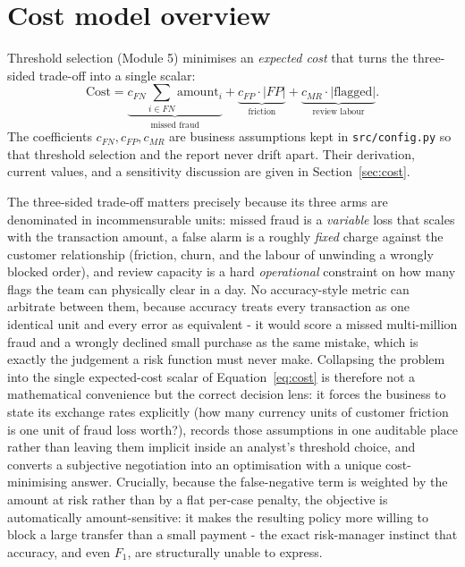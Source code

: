\documentclass[11pt,a4paper]{report}
\newcommand{\code}[1]{\texttt{\small #1}}
\begin{document}
\section{Cost model overview}
\label{sec:costoverview}

Threshold selection (Module 5) minimises an \emph{expected cost} that turns the three-sided
trade-off into a single scalar:
\begin{equation}
\label{eq:cost}
\text{Cost} =
\underbrace{c_{FN}\!\!\sum_{i\in FN}\!\text{amount}_i}_{\text{missed fraud}}
+\underbrace{c_{FP}\cdot|FP|}_{\text{friction}}
+\underbrace{c_{MR}\cdot|\text{flagged}|}_{\text{review labour}} .
\end{equation}
The coefficients $c_{FN}, c_{FP}, c_{MR}$ are business assumptions kept in
\code{src/config.py} so that threshold selection and the report never drift apart. Their
derivation, current values, and a sensitivity discussion are given in
Section~\ref{sec:cost}.

The three-sided trade-off matters precisely because its three arms are denominated in incommensurable units: missed fraud is a \emph{variable} loss that scales with the transaction amount, a false alarm is a roughly \emph{fixed} charge against the customer relationship (friction, churn, and the labour of unwinding a wrongly blocked order), and review capacity is a hard \emph{operational} constraint on how many flags the team can physically clear in a day. No accuracy-style metric can arbitrate between them, because accuracy treats every transaction as one identical unit and every error as equivalent - it would score a missed multi-million fraud and a wrongly declined small purchase as the same mistake, which is exactly the judgement a risk function must never make. Collapsing the problem into the single expected-cost scalar of Equation~\ref{eq:cost} is therefore not a mathematical convenience but the correct decision lens: it forces the business to state its exchange rates explicitly (how many currency units of customer friction is one unit of fraud loss worth?), records those assumptions in one auditable place rather than leaving them implicit inside an analyst's threshold choice, and converts a subjective negotiation into an optimisation with a unique cost-minimising answer. Crucially, because the false-negative term is weighted by the amount at risk rather than by a flat per-case penalty, the objective is automatically amount-sensitive: it makes the resulting policy more willing to block a large transfer than a small payment - the exact risk-manager instinct that accuracy, and even $F_1$, are structurally unable to express.
\end{document}

